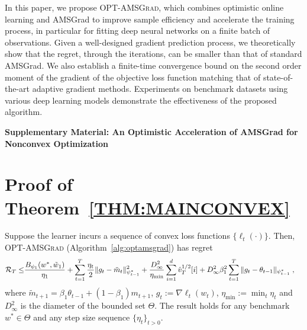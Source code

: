 \documentclass[wcp]{jmlr}
\begin{document}
In this paper, we propose \textsc{OPT-AMSGrad}, which combines optimistic online learning and AMSGrad to improve sample efficiency and accelerate the training process, in particular for fitting deep neural networks on a finite batch of observations. 
Given a well-designed gradient prediction process, we theoretically show that the regret, through the iterations, can be smaller than that of standard AMSGrad.
We also establish a finite-time convergence bound on the second order moment of the gradient of the objective loss function matching that of state-of-the-art adaptive gradient methods.
Experiments on benchmark datasets using various deep learning models demonstrate the effectiveness of the proposed algorithm.






\clearpage




\appendix

  
{\Large\bfseries Supplementary Material: An Optimistic Acceleration of AMSGrad for Nonconvex Optimization \par}


\section{Proof of Theorem~\ref{THM:MAINCONVEX}}\label{app:thmmainconvex}
\begin{Theorem*}
Suppose the learner incurs a sequence of convex loss functions $\{ \ell_{t}(\cdot) \}$.
Then,  \textsc{OPT-AMSGrad} (Algorithm~\ref{alg:optamsgrad}) has regret 
\begin{equation}\notag
\begin{aligned}
\mathcal{R}_T \leq &   \frac{ B_{\psi_1}(w^*, \tilde{w}_{1})}{\eta_1}
+ \sum_{t=1}^T\frac{\eta_t}{2} \| g_t - \tilde{m}_t  \|_{\psi_{t-1}^*}^2  + \frac{D_{\infty}^2}{\eta_{\min}}  \sum_{i=1}^d \hat{v}_{T}^{1/2}[i] + D_{\infty}^2\beta_1^2   \sum_{t=1}^T  \| g_t - \theta_{t-1}  \|_{\psi_{t-1}^*}\eqsp,
\end{aligned}
\end{equation}
where $ \tilde{m}_{t+1}  = \beta_1 \theta_{t-1} +(1-\beta_1) m_{t+1}$, $g_{t}:= \nabla \ell_{t}(w_t)$, $\eta_{{\min}} := \min_{{t}} \eta_{t}$ and $D_{\infty}^2$ is the diameter of the bounded set $\Theta$.
The result holds for any benchmark $w^{*} \in \Theta$ and any step size sequence $\{ \eta_t \}_{t>0}$.
\end{Theorem*}
\end{document}
